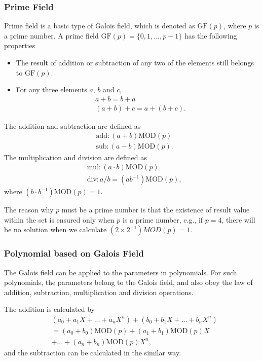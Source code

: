 \documentclass[journal]{IEEEtran}
\begin{document}
\subsubsection{Prime Field}
Prime field is a basic type of Galois field, which is denoted as $\text{GF}(p)$, where $p$ is a prime number. A prime field $\text{GF}(p)=\{0,1,...,p-1\}$ has the following properties
\begin{itemize}
    \item The result of addition or subtraction of any two of the elements still belongs to $\text{GF}(p)$.
    \item For any three elements $a$, $b$ and $c$, 
    \begin{align}
        &a+b=b+a\\ 
        &(a+b)+c=a+(b+c).
    \end{align}
\end{itemize}
The addition and subtraction are defined as 
\begin{align}
    &\text{add}:(a+b)\text{MOD}(p)\\
    &\text{sub}:(a-b)\text{MOD}(p).
\end{align}
The multiplication and division are defined as 
\begin{align}
    &\text{mul}:(a\cdot b)\text{MOD}(p)\\
    &\text{div}:a/b=(a{{b}^{-1}})\text{MOD}(p),
\end{align}
where $(b\cdot{{b}^{-1}})\text{MOD}(p)=1$.

The reason why $p$ must be a prime number is that the existence of result value within the set is ensured only when $p$ is a prime number, e.g., if $p=4$, there will be no solution when we calculate $(2\times 2^{-1}) MOD(p)=1$.

\subsubsection{Polynomial based on Galois Field}
The Galois field can be applied to the parameters in polynomials. For such polynomials, the parameters belong to the Galois field, and also obey the law of addition, subtraction, multiplication and division operations. 

The addition is calculated by
\begin{align}
  & ({{a}_{0}}+{{a}_{1}}X+...+{{a}_{n}}{{X}^{n}})+({{b}_{0}}+{{b}_{1}}X+...+{{b}_{n}}{{X}^{n}}) \nonumber\\ 
 & =({{a}_{0}}+{{b}_{0}})\text{MOD}(p)+({{a}_{1}}+{{b}_{1}})\text{MOD}(p)X \nonumber\\ 
 & +...+({{a}_{n}}+{{b}_{n}})\text{MOD}(p){{X}^{n}},
\end{align}
and the subtraction can be calculated in the similar way.
\end{document}

